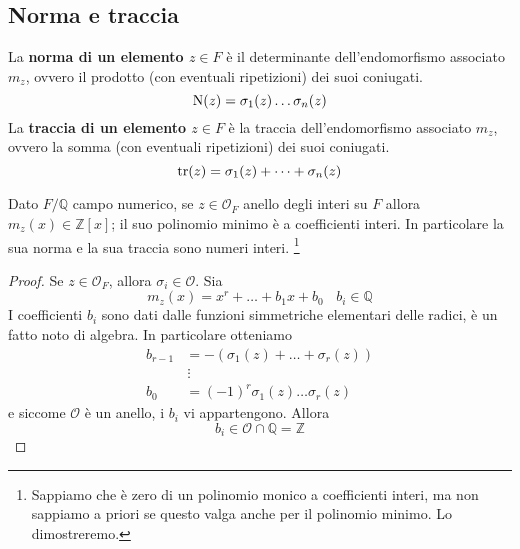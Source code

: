 \subsection{Norma e traccia}
\begin{definizione}
	La \textbf{norma di un elemento $z\in F$} è il determinante dell'endomorfismo associato $m_z$, ovvero il prodotto (con eventuali ripetizioni) dei suoi coniugati. 
	\begin{equation*}
	\operatorname{N}(z)=\sigma_1(z)\dots\sigma_n(z)
	\end{equation*}
	La \textbf{traccia di un elemento $z\in F$} è la traccia dell'endomorfismo associato $m_z$, ovvero la somma (con eventuali ripetizioni) dei suoi coniugati.
	\begin{equation*}
	\operatorname{tr}(z)=\sigma_1(z)+\dots+\sigma_n(z)
	\end{equation*}
\end{definizione}
\begin{proposizione}
	Dato $F/\mathbb{Q}$ campo numerico, se $z\in \mathcal{O}_F$ anello degli interi su $F$ allora $m_z(x)\in\mathbb{Z}[x]$; il suo polinomio minimo è a coefficienti interi. In particolare la sua norma e la sua traccia sono numeri interi. \footnote{Sappiamo che è zero di un polinomio monico a coefficienti interi, ma non sappiamo a priori se questo valga anche per il polinomio minimo. Lo dimostreremo.}
\end{proposizione}
\begin{proof}
	Se $z\in \mathcal{O}_F$, allora $\sigma_i\in \mathcal{O}$. Sia 
	\begin{equation*}
	m_z(x)=x^r+\dots+b_1x+b_0 \ \ \ \ b_i\in\mathbb{Q}
	\end{equation*}
	I coefficienti $b_i$ sono dati dalle funzioni simmetriche elementari delle radici, è un fatto noto di algebra. In particolare otteniamo
	\begin{equation*}
		\begin{array}{ll}
			b_{r-1}&=-\left(\sigma_1(z)+\dots+\sigma_r(z)\right)\\
			&\,\vdots\\
			b_0&=(-1)^r\sigma_1(z)\dots\sigma_r(z)
		\end{array}
	\end{equation*}
	e siccome $\mathcal{O}$ è un anello, i $b_i$ vi appartengono. Allora 
	\begin{equation*}
	b_i\in \mathcal{O}\cap\mathbb{Q}=\mathbb{Z}
	\end{equation*}
\end{proof}




